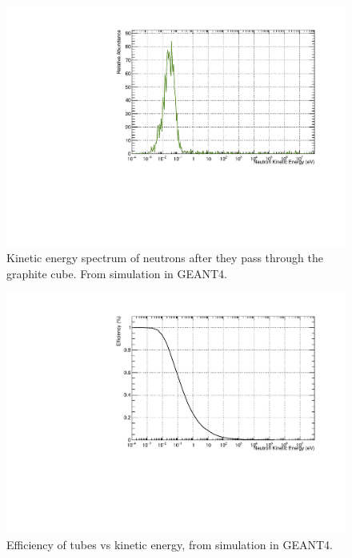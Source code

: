 \begin{figure}
	\centerfloat
		\includegraphics[trim={0 0 0 0.75cm},clip, width=\textwidth]{images/AfterGraphite}
	\caption[Kinetic energy spectrum of neutrons after they pass through the graphite cube]{Kinetic energy spectrum of neutrons after they pass through the graphite cube. From simulation in GEANT4.}	
	\label{fig:afterGraphite}
\end{figure}


\begin{figure}
	\centerfloat
		\includegraphics[trim={0 0 0 0.75cm},clip, width=\textwidth]{images/Efficiency_inside}
	\caption[Efficiency of \he tubes vs kinetic energy]{Efficiency of \he tubes vs kinetic energy, from simulation in GEANT4.}
	\label{fig:he3eff}
\end{figure}


